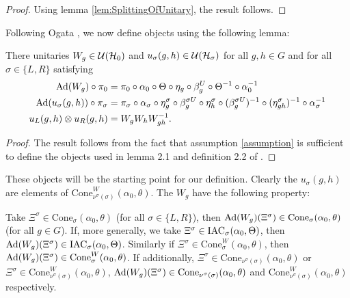 \documentclass[11pt,a4paper,twoside]{article}
\numberwithin{equation}{section}
\begin{document}
	\begin{proof}
		Using lemma \ref{lem:SplittingOfUnitary}, the result follows.
	\end{proof}
	Following Ogata \cite{ogata2021h3gmathbb}, we now define objects using the following lemma:
	\begin{lemma}\label{lem:Definition_W_And_u}
		There unitaries $W_g\in\mathcal U(\mathcal H_0)$ and $u_{\sigma}(g,h)\in\mathcal U(\mathcal H_{\sigma})$ for all $g,h\in G$ and for all $\sigma\in\{L,R\}$ satisfying
		\begin{align}
			\Ad{W_g}\circ\pi_0&=\pi_0\circ\alpha_0\circ\Theta\circ\eta_g\circ\beta_g^U\circ\Theta^{-1}\circ\alpha_0^{-1}\\
			\Ad{u_\sigma(g,h)}\circ\pi_\sigma&=\pi_\sigma\circ\alpha_\sigma\circ\eta_g^\sigma\circ\beta_g^{\sigma U}\circ\eta_h^{\sigma}\circ(\beta_g^{\sigma U})^{-1}\circ(\eta^\sigma_{gh})^{-1}\circ\alpha_\sigma^{-1}\\
			u_L(g,h)\otimes u_R(g,h)&=W_gW_hW_{gh}^{-1}.
		\end{align}
	\end{lemma}
	\begin{proof}
		The result follows from the fact that assumption \ref{assumption} is sufficient to define the objects used in lemma 2.1 and definition 2.2 of \cite{ogata2021h3gmathbb}.
	\end{proof}
	These objects will be the starting point for our definition. Clearly the $u_\sigma(g,h)$ are elements of $\textrm{Cone}_{\nu^\sigma(\sigma)}^W(\alpha_0,\theta)$. The $W_g$ have the following property:
	\begin{lemma}\label{lem:AdjointOverConeIsInCone}
		Take $\Xi^{\sigma}\in\textrm{Cone}_\sigma(\alpha_0,\theta)$ (for all $\sigma\in\{L,R\}$), then $\Ad{W_g}(\Xi^\sigma)\in\textrm{Cone}_\sigma(\alpha_0,\theta)$ (for all $g\in G$). If, more generally, we take $\Xi^\sigma\in\textrm{IAC}_\sigma(\alpha_0,\Theta)$, then $\Ad{W_g}(\Xi^\sigma)\in\IAC_\sigma(\alpha_0,\Theta)$. Similarly if $\Xi^{\sigma}\in\textrm{Cone}_\sigma^W(\alpha_0,\theta)$, then $\Ad{W_g}(\Xi^\sigma)\in\textrm{Cone}_\sigma^W(\alpha_0,\theta)$. If additionally, $\Xi^{\sigma}\in\textrm{Cone}_{\nu^\sigma(\sigma)}(\alpha_0,\theta)$ or $\Xi^{\sigma}\in\textrm{Cone}_{\nu^\sigma(\sigma)}^W(\alpha_0,\theta)$, $\Ad{W_g}(\Xi^\sigma)\in\textrm{Cone}_{\nu^\sigma(\sigma)}(\alpha_0,\theta)$ and $\textrm{Cone}_{\nu^\sigma(\sigma)}^W(\alpha_0,\theta)$ respectively.
	\end{lemma}
\end{document}
